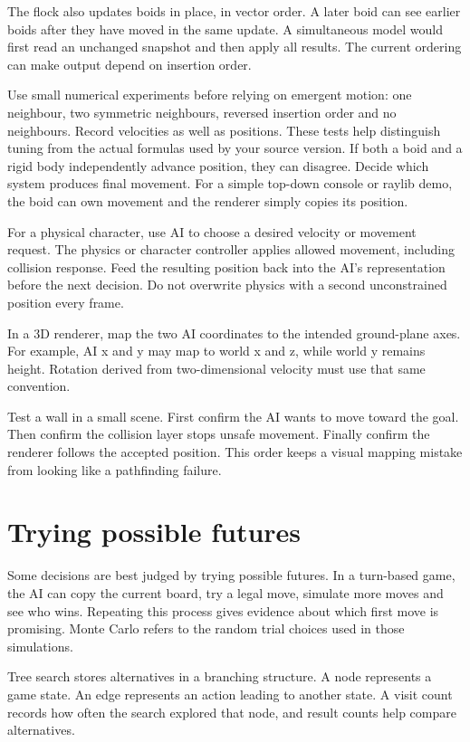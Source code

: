 \documentclass[11pt,a4paper]{article}
\begin{document}
The flock also updates boids in place, in vector order. A later boid can see earlier boids after they have moved in the same update. A simultaneous model would first read an unchanged snapshot and then apply all results. The current ordering can make output depend on insertion order.

Use small numerical experiments before relying on emergent motion: one neighbour, two symmetric neighbours, reversed insertion order and no neighbours. Record velocities as well as positions. These tests help distinguish tuning from the actual formulas used by your source version.
If both a boid and a rigid body independently advance position, they can disagree. Decide which system produces final movement. For a simple top-down console or raylib demo, the boid can own movement and the renderer simply copies its position.

For a physical character, use AI to choose a desired velocity or movement request. The physics or character controller applies allowed movement, including collision response. Feed the resulting position back into the AI's representation before the next decision. Do not overwrite physics with a second unconstrained position every frame.

In a 3D renderer, map the two AI coordinates to the intended ground-plane axes. For example, AI x and y may map to world x and z, while world y remains height. Rotation derived from two-dimensional velocity must use that same convention.

Test a wall in a small scene. First confirm the AI wants to move toward the goal. Then confirm the collision layer stops unsafe movement. Finally confirm the renderer follows the accepted position. This order keeps a visual mapping mistake from looking like a pathfinding failure.
\clearpage\part{Trying possible futures}
Some decisions are best judged by trying possible futures. In a turn-based game, the AI can copy the current board, try a legal move, simulate more moves and see who wins. Repeating this process gives evidence about which first move is promising. Monte Carlo refers to the random trial choices used in those simulations.

Tree search stores alternatives in a branching structure. A node represents a game state. An edge represents an action leading to another state. A visit count records how often the search explored that node, and result counts help compare alternatives.
\end{document}
